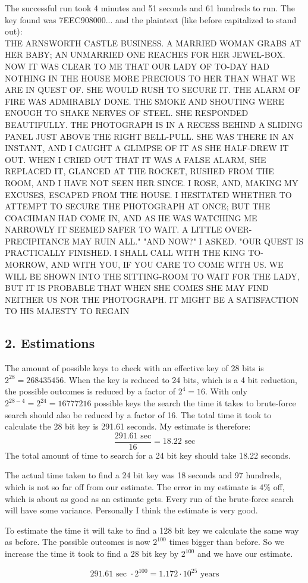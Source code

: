 The successful run took 4 minutes and 51 seconds and 61 hundreds to run.
The key found was 7EEC908000... and the plaintext (like before capitalized to stand out): \\
THE ARNSWORTH CASTLE BUSINESS. A MARRIED WOMAN GRABS AT HER BABY;
AN UNMARRIED ONE REACHES FOR HER JEWEL-BOX. NOW IT WAS CLEAR TO
ME THAT OUR LADY OF TO-DAY HAD NOTHING IN THE HOUSE MORE PRECIOUS
TO HER THAN WHAT WE ARE IN QUEST OF. SHE WOULD RUSH TO SECURE IT.
THE ALARM OF FIRE WAS ADMIRABLY DONE. THE SMOKE AND SHOUTING WERE
ENOUGH TO SHAKE NERVES OF STEEL. SHE RESPONDED BEAUTIFULLY. THE
PHOTOGRAPH IS IN A RECESS BEHIND A SLIDING PANEL JUST ABOVE THE
RIGHT BELL-PULL. SHE WAS THERE IN AN INSTANT, AND I CAUGHT A
GLIMPSE OF IT AS SHE HALF-DREW IT OUT. WHEN I CRIED OUT THAT IT
WAS A FALSE ALARM, SHE REPLACED IT, GLANCED AT THE ROCKET, RUSHED
FROM THE ROOM, AND I HAVE NOT SEEN HER SINCE. I ROSE, AND, MAKING
MY EXCUSES, ESCAPED FROM THE HOUSE. I HESITATED WHETHER TO
ATTEMPT TO SECURE THE PHOTOGRAPH AT ONCE; BUT THE COACHMAN HAD
COME IN, AND AS HE WAS WATCHING ME NARROWLY IT SEEMED SAFER TO
WAIT. A LITTLE OVER-PRECIPITANCE MAY RUIN ALL."
"AND NOW?" I ASKED.
"OUR QUEST IS PRACTICALLY FINISHED. I SHALL CALL WITH THE KING
TO-MORROW, AND WITH YOU, IF YOU CARE TO COME WITH US. WE WILL BE
SHOWN INTO THE SITTING-ROOM TO WAIT FOR THE LADY, BUT IT IS
PROBABLE THAT WHEN SHE COMES SHE MAY FIND NEITHER US NOR THE
PHOTOGRAPH. IT MIGHT BE A SATISFACTION TO HIS MAJESTY TO REGAIN

\subsection*{2. Estimations}

The amount of possible keys to check with an effective key of 28 bits is $2^{28} = 268 435 456$.
When the key is reduced to 24 bits, which is a 4 bit reduction, the possible outcomes is reduced by a factor of $2^{4} = 16$.
With only $2^{28-4} = 2^{24} = 16 777 216$ possible keys the search the time it takes to brute-force search should also be reduced by a factor of 16.
The total time it took to calculate the 28 bit key is 291.61 seconds.
My estimate is therefore:
$$ \frac{291.61 \text{ sec}}{16} = 18.22 \text{ sec} $$
The total amount of time to search for a 24 bit key should take 18.22 seconds.

The actual time taken to find a 24 bit key was 18 seconds and 97 hundreds, which is not so far off from our estimate.
The error in my estimate is $4 \%$ off, which is about as good as an estimate gets.
Every run of the brute-force search will have some variance.
Personally I think the estimate is very good.

To estimate the time it will take to find a 128 bit key we calculate the same way as before.
The possible outcomes is now $2^{100}$ times bigger than before.
So we increase the time it took to find a 28 bit key by $2^{100}$ and we have our estimate.

$$ 291.61 \text{ sec } \cdot 2^{100} = 1.172 \cdot 10^{25} \text{ years} $$
